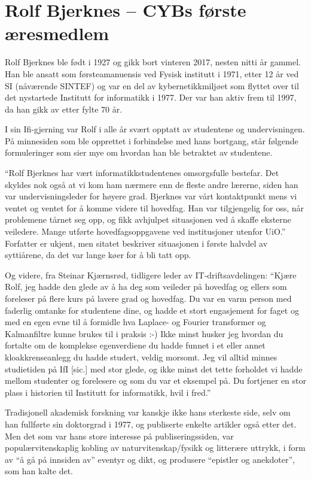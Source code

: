 \chapter[Rolf Bjerknes]{Rolf Bjerknes -- CYBs første æresmedlem}

\author{Skrevet av Narve Trædal}

Rolf Bjerknes ble født i 1927 og gikk bort vinteren 2017, nesten nitti år gammel. Han ble ansatt som førsteamanuensis ved Fysisk institutt i 1971, etter 12 år ved SI (nåværende SINTEF) og var en del av kybernetikkmiljøet som flyttet over til det nystartede Institutt for informatikk i 1977. Der var han
aktiv frem til 1997, da han gikk av etter fylte 70 år.

I sin Ifi-gjerning var Rolf i alle år svært opptatt av studentene og undervisningen. På minnesiden som ble opprettet i forbindelse med hans bortgang, står følgende formuleringer som sier mye om hvordan han ble betraktet av studentene.

``Rolf Bjerknes har vært informatikkstudentenes omsorgsfulle bestefar. Det skyldes nok også at vi kom ham nærmere enn de fleste andre lærerne, siden han var undervisningsleder for høyere grad. Bjerknes var vårt kontaktpunkt mens vi ventet og ventet for å komme videre til hovedfag. Han var tilgjengelig for oss, når problemene tårnet seg opp, og fikk avhjulpet situasjonen ved å skaffe eksterne veiledere. Mange utførte hovedfagsoppgavene ved institusjoner utenfor UiO.'' Forfatter er ukjent, men sitatet beskriver situasjonen i første halvdel av syttiårene, da det var lange køer for å bli tatt opp.

Og videre, fra Steinar Kjærnsrød, tidligere leder av IT-driftsavdelingen: ``Kjære Rolf, jeg hadde den glede av å ha deg som veileder på hovedfag og ellers som foreleser på flere kurs på lavere grad og hovedfag. Du var en varm person med faderlig omtanke for studentene dine, og hadde et stort engasjement for faget og med en egen evne til å formidle hva Laplace- og Fourier transformer og Kalmanfiltre kunne brukes til i praksis :-) Ikke minst husker jeg hvordan du fortalte om de komplekse egenverdiene du hadde funnet i et eller annet kloakkrenseanlegg du hadde studert, veldig morsomt. Jeg vil alltid minnes studietiden på IfI [sic.] med stor glede, og ikke minst det tette forholdet vi hadde mellom studenter og forelesere og som du var et eksempel på. Du fortjener en stor plass i historien til Institutt for informatikk, hvil i fred.''

Tradisjonell akademisk forskning var kanskje ikke hans sterkeste side, selv om han fullførte sin doktorgrad i 1977, og publiserte enkelte artikler også etter det. Men det som var hans store interesse på publiseringssiden, var populærvitenskaplig kobling av naturvitenskap\slash fysikk og litterære uttrykk, i form av ``å gå på innsiden av'' eventyr og dikt, og produsere ``epistler og anekdoter'', som han kalte det.

